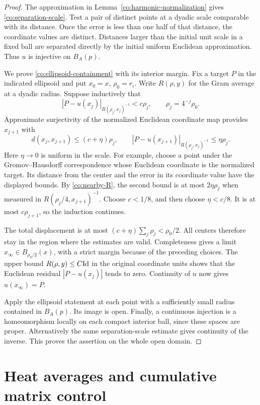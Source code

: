 \begin{proof}
The approximation in Lemma~\ref{co:harmonic-normalization} gives
\eqref{co:separation-scale}.  Test a pair of distinct points at a
dyadic scale comparable with its distance.  Once the error is
less than one half of that distance, the coordinate values are
distinct.  Distances larger than the initial unit scale in a
fixed ball are separated directly by the initial uniform
Euclidean approximation.  Thus \(u\) is injective on \(B_A(p)\).

We prove \eqref{co:ellipsoid-containment} with its interior margin.
Fix a target \(P\) in the indicated ellipsoid and put
\(x_0=x\), \(\rho_0=r_i\).  Write \(R(\rho,y)\) for the Gram
average at a dyadic radius.  Suppose inductively that
\[
 |P-u(x_j)|_{R(\rho_j,x_j)^{-1}}<c\rho_j,
 \qquad \rho_j=4^{-j}\rho_0.
\]
Approximate surjectivity of the normalized Euclidean coordinate
map provides \(x_{j+1}\) with
\[
 d(x_j,x_{j+1})\le(c+\eta)\rho_j,
 \qquad
 |P-u(x_{j+1})|_{R(\rho_j,x_j)^{-1}}\le\eta\rho_j.
\]
Here \(\eta\to0\) is uniform in the scale.  For example, choose a
point under the Gromov--Hausdorff correspondence whose Euclidean
coordinate is the normalized target.  Its distance from the
center and the error in its coordinate value have the displayed
bounds.  By \eqref{co:nearby-R}, the second bound is at most
\(2\eta\rho_j\) when measured in
\(R(\rho_j/4,x_{j+1})^{-1}\).  Choose \(c<1/8\), and then choose
\(\eta<c/8\).  It is at most \(c\rho_{j+1}\), so the induction
continues.

The total displacement is at most
\((c+\eta)\sum_j\rho_j<\rho_0/2\).  All centers therefore stay
in the region where the estimates are valid.  Completeness gives
a limit \(x_\infty\in B_{\rho_0/2}(x)\), with a strict margin
because of the preceding choices.  The upper bound \(R(\rho,y)
\le C\mathrm{Id}\) in the original coordinate units shows that the
Euclidean residual \(|P-u(x_j)|\) tends to zero.  Continuity of
\(u\) now gives \(u(x_\infty)=P\).

Apply the ellipsoid statement at each point with a sufficiently
small radius contained in \(B_A(p)\).  Its image is open.  Finally,
a continuous injection is a homeomorphism locally on each compact
interior ball, since these spaces are proper.  Alternatively the
same separation-scale estimate gives continuity of the inverse.
This proves the assertion on the whole open domain.
\end{proof}

\section{Heat averages and cumulative matrix control}
\label{co:heat-section}

